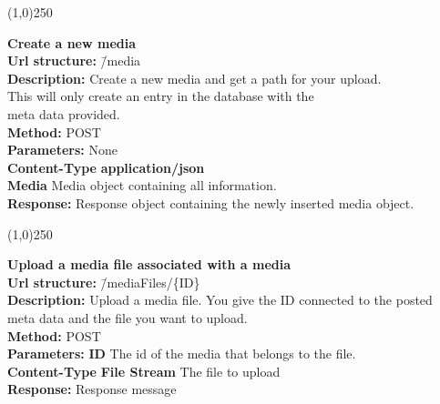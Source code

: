 \documentclass[11pt]{article}
\begin{document}
\begin{center}\line(1,0){250}\end{center}

\begin{tabbing}
\textbf{Create a new media} \\
\textcolor{black!60}{\textbf{Url structure:}} \hspace{0.2in} \= /media \\
\textcolor{black!60}{\textbf{Description:}}  \> Create a new media and get a path for your upload. \\ \> This will only create an entry in the database with the \\ \> meta data provided. \\
\textcolor{black!60}{\textbf{Method:}} \> POST \\
\textcolor{black!60}{\textbf{Parameters:}} \> None \\
\textcolor{black!60}{\textbf{Content-Type}} \> \textbf{application/json} \\
\> \textbf{Media} Media object containing all information. \\
\textcolor{black!60}{\textbf{Response:}} \> Response object containing the newly inserted media object.
\end{tabbing}

\begin{center}\line(1,0){250}\end{center}

\begin{tabbing}
\textbf{Upload a media file associated with a media} \\
\textcolor{black!60}{\textbf{Url structure:}} \hspace{0.2in} \= /mediaFiles/\{ID\} \\
\textcolor{black!60}{\textbf{Description:}}  \> Upload a media file. You give the ID connected to the posted \\ \> meta data and the file you want to upload. \\
\textcolor{black!60}{\textbf{Method:}} \> POST \\
\textcolor{black!60}{\textbf{Parameters:}} \> \textbf{ID} The id of the media that belongs to the file. \\
\textcolor{black!60}{\textbf{Content-Type}} \> \textbf{File Stream} The file to upload \\
\textcolor{black!60}{\textbf{Response:}} \> Response message
\end{tabbing}
\end{document}
